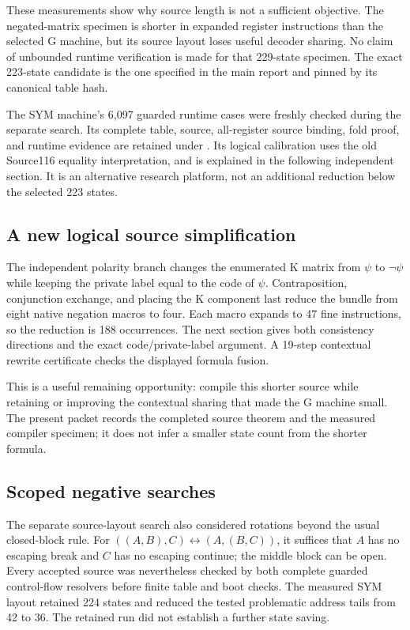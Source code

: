 These measurements show why source length is not a sufficient objective.
The negated-matrix specimen is shorter in expanded register instructions
than the selected G machine, but its source layout loses useful decoder
sharing.  No claim of unbounded runtime verification is made for that
229-state specimen.  The exact 223-state candidate is the one specified
in the main report and pinned by its canonical table hash.

The SYM machine's 6,097 guarded runtime cases were freshly checked during
the separate search.  Its complete table, source, all-register source
binding, fold proof, and runtime evidence are retained under
.  Its logical calibration uses
the old Source116 equality interpretation, and is explained in the
following independent section.  It is an alternative research platform,
not an additional reduction below the selected 223 states.

\subsection{A new logical source simplification}

The independent polarity branch changes the enumerated K matrix from
$\psi$ to $\neg\psi$ while keeping the private label equal to the
code of $\psi$.  Contraposition, conjunction exchange, and placing the K
component last reduce the bundle from eight native negation macros to
four.  Each macro expands to 47 fine instructions, so the reduction is
188 occurrences.  The next section gives both consistency directions
and the exact code/private-label argument.  A 19-step contextual rewrite
certificate checks the displayed formula fusion.

This is a useful remaining opportunity: compile this shorter source while
retaining or improving the contextual sharing that made the G machine
small.  The present packet records the completed source theorem and the
measured compiler specimen; it does not infer a smaller state count from
the shorter formula.

\subsection{Scoped negative searches}

The separate source-layout search also considered rotations beyond the
usual closed-block rule.  For
$((A,B),C)\leftrightarrow(A,(B,C))$, it suffices that $A$ has no escaping
break and $C$ has no escaping continue; the middle block can be open.
Every accepted source was nevertheless checked by both complete guarded
control-flow resolvers before finite table and boot checks.
The measured SYM layout retained 224 states and reduced the tested
problematic address tails from 42 to 36.  The retained run did not
establish a further state saving.

